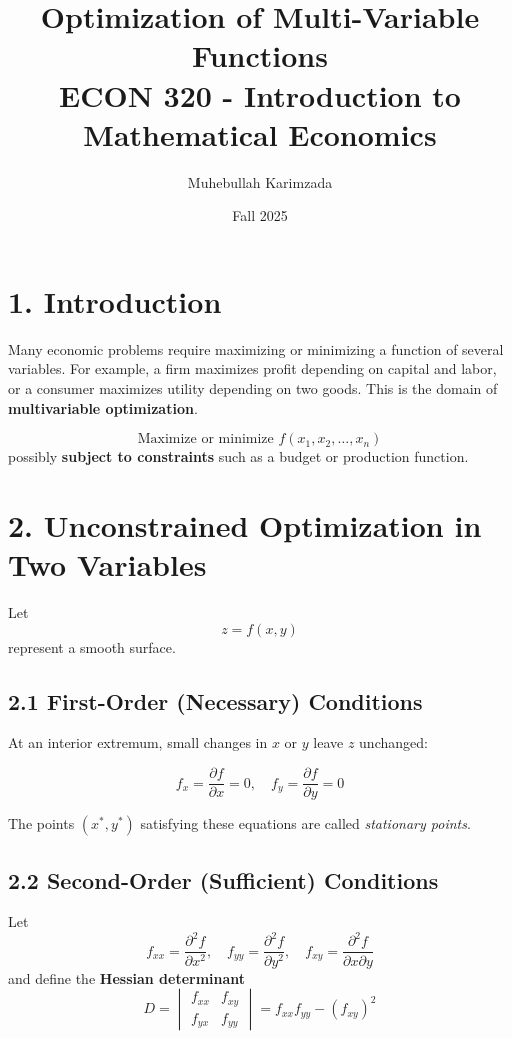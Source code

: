 \documentclass[12pt]{article}
\title{Optimization of Multi-Variable Functions\\[7pt]
\large ECON 320 - Introduction to Mathematical Economics}
\author{Muhebullah Karimzada}
\date{Fall 2025}
\begin{document}
\maketitle

\section*{1. Introduction}

Many economic problems require maximizing or minimizing a function of several variables. 
For example, a firm maximizes profit depending on capital and labor, or a consumer maximizes utility depending on two goods. 
This is the domain of \textbf{multivariable optimization}.

\[
\text{Maximize or minimize } f(x_1, x_2, \ldots, x_n)
\]
possibly \textbf{subject to constraints} such as a budget or production function.



\section*{2. Unconstrained Optimization in Two Variables}

Let
\[
z = f(x, y)
\]
represent a smooth surface.

\subsection*{2.1 First-Order (Necessary) Conditions}

At an interior extremum, small changes in \(x\) or \(y\) leave \(z\) unchanged:

\[
f_x = \frac{\partial f}{\partial x} = 0, \quad f_y = \frac{\partial f}{\partial y} = 0
\]

The points \((x^*, y^*)\) satisfying these equations are called \textit{stationary points}.



\subsection*{2.2 Second-Order (Sufficient) Conditions}

Let
\[
f_{xx} = \frac{\partial^2 f}{\partial x^2}, \quad f_{yy} = \frac{\partial^2 f}{\partial y^2}, \quad f_{xy} = \frac{\partial^2 f}{\partial x \partial y}
\]
and define the \textbf{Hessian determinant}
\[
D = 
\begin{vmatrix}
f_{xx} & f_{xy} \\
f_{yx} & f_{yy}
\end{vmatrix}
= f_{xx}f_{yy} - (f_{xy})^2
\]
\end{document}
